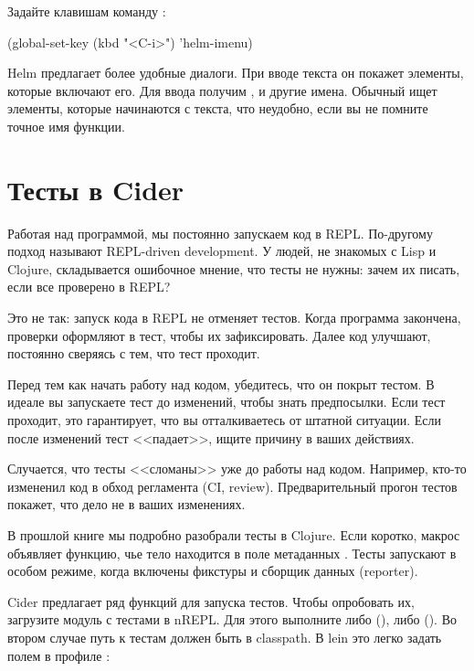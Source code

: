 Задайте клавишам  команду :

\begin{english}
  \begin{lisp}
(global-set-key (kbd "<C-i>") 'helm-imenu)
  \end{lisp}
\end{english}

Helm предлагает более удобные диалоги. При вводе текста он покажет элементы, которые включают его. Для ввода  получим ,  и другие имена. Обычный  ищет элементы, которые начинаются с текста, что неудобно, если вы не помните точное имя функции.

\section{Тесты в Cider}

Работая над программой, мы постоянно запускаем код в REPL. По-другому подход называют REPL-driven development. У людей, не знакомых с Lisp и Clojure, складывается ошибочное мнение, что тесты не нужны: зачем их писать, если все проверено в REPL?

Это не так: запуск кода в REPL не отменяет тестов. Когда программа закончена, проверки оформляют в тест, чтобы их зафиксировать. Далее код улучшают, постоянно сверяясь с тем, что тест проходит.

Перед тем как начать работу над кодом, убедитесь, что он покрыт тестом. В идеале вы запускаете тест до изменений, чтобы знать предпосылки. Если тест проходит, это гарантирует, что вы отталкиваетесь от штатной ситуации. Если после изменений тест <<падает>>, ищите причину в ваших действиях.

Случается, что тесты <<сломаны>> уже до работы над кодом. Например, кто-то измененил код в обход регламента (CI, review). Предварительный прогон тестов покажет, что дело не в ваших изменениях.

В прошлой книге мы подробно разобрали тесты в Clojure. Если коротко, макрос  объявляет функцию, чье тело находится в поле метаданных . Тесты запускают в особом режиме, когда включены фикстуры и сборщик данных (reporter).

Cider предлагает ряд функций для запуска тестов. Чтобы опробовать их, загрузите модуль с тестами в nREPL. Для этого выполните либо  (), либо  (). Во втором случае путь к тестам должен быть в classpath. В lein это легко задать полем  в профиле :

